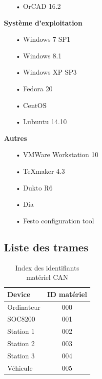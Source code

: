 \documentclass[10pt,a4paper,final]{article}
\begin{document}
\begin{spacing}{1.5}
\begin{flushleft}
\begin{multicols}{3}
\begin{itemize}
\item[•]OrCAD 16.2
\end{itemize}

\bigskip

\textbf{Système d'exploitation}
\begin{itemize}
\item[•]Windows 7 SP1
\item[•]Windows 8.1
\item[•]Windows XP SP3
\item[•]Fedora 20
\item[•]CentOS
\item[•]Lubuntu 14.10
\end{itemize}

\textbf{Autres}
\begin{itemize}
\item[•]VMWare Workstation 10
\item[•]TeXmaker 4.3
\item[•]Dukto R6
\item[•]Dia
\item[•]Festo configuration tool
\end{itemize}

\end{multicols}
\end{flushleft}
\begin{flushleft}
\HRule
\end{flushleft}

\pagebreak
\subsection{Liste des trames}

\begin{table}[!ht]
\caption{Index des identifiants matériel CAN}
\medskip
\centering
\begin{tabular}{|l|c|}
\hline 
\textbf{Device} & \textbf{ID matériel} \\ 
\hline 
Ordinateur & 000 \\ 
\hline 
SOC8200 & 001 \\ 
\hline 
Station 1 & 002 \\ 
\hline 
Station 2  & 003 \\ 
\hline
Station 3  & 004 \\
\hline 
Véhicule  & 005 \\ 
\hline 
\end{tabular} 
\label{tab:testtab1}
\end{table} 



\end{spacing}
\end{document}
